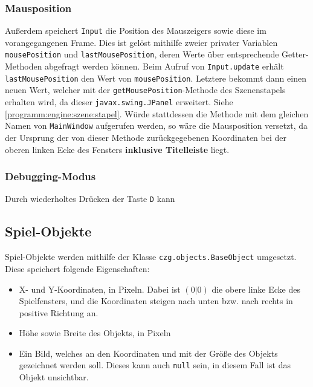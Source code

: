 \begin{sloppypar}
\subsubsection{Mausposition}

Außerdem speichert \texttt{Input} die Position des Mauszeigers
sowie diese im vorangegangenen Frame. Dies ist gelöst mithilfe
zweier privater Variablen \texttt{mousePosition} und
\texttt{lastMousePosition}, deren Werte über entsprechende
Getter-Methoden abgefragt werden können. Beim Aufruf von
\texttt{Input.update} erhält \texttt{lastMousePosition} den
Wert von \texttt{mousePosition}. Letztere bekommt dann einen
neuen Wert, welcher mit der \texttt{getMousePosition}-Methode
des Szenenstapels erhalten wird, da dieser \texttt{javax.swing.JPanel}
erweitert. Siehe \ref{programm:engine:szene:stapel}. Würde
stattdessen die Methode mit dem gleichen Namen von \texttt{MainWindow}
aufgerufen werden, so wäre die Mausposition versetzt, da der
Ursprung der von dieser Methode zurückgegebenen Koordinaten
bei der oberen linken Ecke des Fensters \textbf{inklusive Titelleiste}
liegt.



\subsubsection{Debugging-Modus}

Durch wiederholtes Drücken der Taste \texttt{D} kann 


\subsection{Spiel-Objekte}

Spiel-Objekte werden mithilfe der Klasse \texttt{czg.objects.BaseObject}
umgesetzt. Diese speichert folgende Eigenschaften:

\begin{itemize}
	\item X- und Y-Koordinaten, in Pixeln. Dabei ist $(0|0)$ die
		  obere linke Ecke des Spielfensters, und die Koordinaten
		  steigen nach unten bzw. nach rechts in positive Richtung an.
	\item Höhe sowie Breite des Objekts, in Pixeln
	\item Ein Bild, welches an den Koordinaten und mit der Größe
	      des Objekts gezeichnet werden soll. Dieses kann auch
	      \texttt{null} sein, in diesem Fall ist das Objekt
	      unsichtbar.
\end{itemize}


\end{sloppypar}
